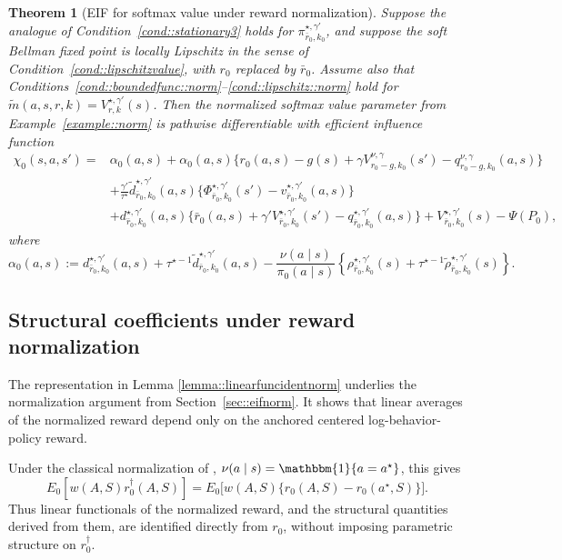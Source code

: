 \documentclass[11pt]{article}
\theoremstyle{plain}
\newtheorem{theorem}{Theorem}
\begin{document}
\begin{theorem}[EIF for softmax value under reward normalization]
\label{theorem::EIFsoftmaxnorm}
Suppose the analogue of Condition~\ref{cond::stationary3} holds for
\(\pi_{\bar r_0,k_0}^{\star,\gamma'}\), and suppose the soft Bellman fixed point
is locally Lipschitz in the sense of Condition~\ref{cond::lipschitzvalue}, with
\(r_0\) replaced by \(\bar r_0\). Assume also that
Conditions~\ref{cond::boundedfunc::norm}--\ref{cond::lipschitz::norm} hold for
\(\tilde m(a,s,r,k)=V_{r,k}^{\star,\gamma'}(s)\). Then the normalized softmax
value parameter from Example~\ref{example::norm} is pathwise differentiable with
efficient influence function
\begin{align*}
\chi_0(s,a,s')
={}& \alpha_0(a,s)
+ \alpha_0(a,s)
   \bigl\{r_0(a,s)-g(s)+\gamma V_{r_0-g,k_0}^{\nu,\gamma}(s')
   -q_{r_0-g,k_0}^{\nu,\gamma}(a,s)\bigr\} \\
&+ \frac{\gamma'}{\tau^\star}
   \widetilde d_{\bar r_0,k_0}^{\star,\gamma'}(a,s)
   \bigl\{\Phi_{\bar r_0,k_0}^{\star,\gamma'}(s')
   -v_{\bar r_0,k_0}^{\star,\gamma'}(a,s)\bigr\} \\
&+ d_{\bar r_0,k_0}^{\star,\gamma'}(a,s)
   \bigl\{\bar r_0(a,s)+\gamma' V_{\bar r_0,k_0}^{\star,\gamma'}(s')
   -q_{\bar r_0,k_0}^{\star,\gamma'}(a,s)\bigr\}
+ V_{\bar r_0,k_0}^{\star,\gamma'}(s) - \Psi(P_0),
\end{align*}
where
\[
\alpha_0(a,s)
:= d_{\bar r_0,k_0}^{\star,\gamma'}(a,s)
+\tau^{\star-1}\widetilde d_{\bar r_0,k_0}^{\star,\gamma'}(a,s)
-\frac{\nu(a\mid s)}{\pi_0(a\mid s)}
\left\{\rho_{\bar r_0,k_0}^{\star,\gamma'}(s)
+\tau^{\star-1}\widetilde\rho_{\bar r_0,k_0}^{\star,\gamma'}(s)\right\}.
\]
\end{theorem}

\subsection{Structural coefficients under reward normalization}

The representation in Lemma \ref{lemma::linearfuncidentnorm} underlies the normalization argument from
Section~\ref{sec::eifnorm}. It shows that linear averages of the normalized
reward depend only on the anchored centered log-behavior-policy reward.

 
 

Under the classical normalization of \citet{rust1987optimal},
\(\nu(a\mid s)=\mathbbm{1}\{a=a^\star\}\), this gives
\[
E_0[w(A,S) r_0^\dagger(A,S)]
= E_0\!\big[w(A,S)\{r_0(A,S)-r_0(a^\star,S)\}\big].
\]
Thus linear functionals of the normalized reward, and the structural quantities
derived from them, are identified directly from \(r_0\), without imposing
parametric structure on \(r_0^\dagger\).
\end{document}
